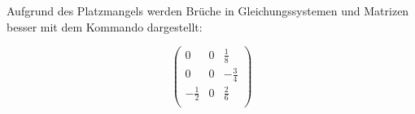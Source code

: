 Aufgrund des Platzmangels werden Brüche in Gleichungssystemen und Matrizen besser mit dem Kommando  dargestellt:

\begin{sidebyside}
	\[\begin{pmatrix}
	 0 & 0 & \tfrac{1}{8} \\
	 0 & 0 & -\tfrac{3}{4} \\
	 -\tfrac{1}{2} & 0 & \tfrac{2}{6} \\
	\end{pmatrix}\]
\end{sidebyside}


